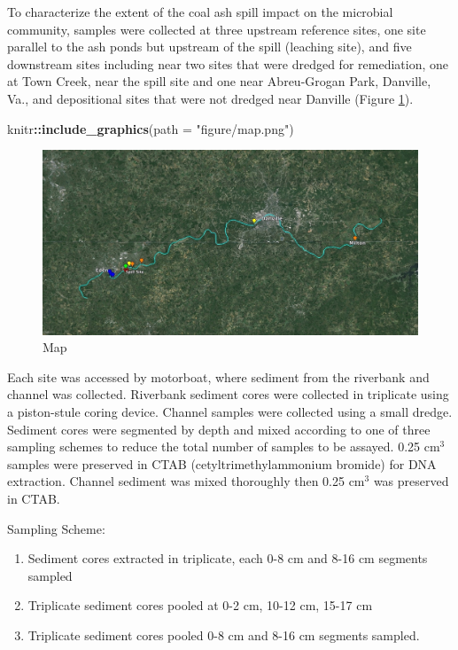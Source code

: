 \documentclass[ms]{uncgdissertationexp}
\newenvironment{Shaded}{\begin{snugshade}}{\end{snugshade}}
\newcommand{\KeywordTok}[1]{\textcolor[rgb]{0.13,0.29,0.53}{\textbf{#1}}}
\newcommand{\DataTypeTok}[1]{\textcolor[rgb]{0.13,0.29,0.53}{#1}}
\newcommand{\StringTok}[1]{\textcolor[rgb]{0.31,0.60,0.02}{#1}}
\newcommand{\OperatorTok}[1]{\textcolor[rgb]{0.81,0.36,0.00}{\textbf{#1}}}
\newcommand{\NormalTok}[1]{#1}
\theoremstyle{plain}
\theoremstyle{definition}
\theoremstyle{remark}
\begin{document}
  To characterize the extent of the coal ash spill impact on the microbial
  community, samples were collected at three upstream reference sites, one
  site parallel to the ash ponds but upstream of the spill (leaching
  site), and five downstream sites including near two sites that were
  dredged for remediation, one at Town Creek, near the spill site and one
  near Abreu-Grogan Park, Danville, Va., and depositional sites that were
  not dredged near Danville (Figure \ref{fig:map}).
  \begin{Shaded}
  \begin{Highlighting}[]
  \NormalTok{knitr}\OperatorTok{::}\KeywordTok{include_graphics}\NormalTok{(}\DataTypeTok{path =} \StringTok{"figure/map.png"}\NormalTok{)}
  \end{Highlighting}
  \end{Shaded}
  \begin{figure}
  \includegraphics[width=24.38in]{figure/map} \caption{Map}\label{fig:map}
  \end{figure}
  Each site was accessed by motorboat, where sediment from the riverbank
  and channel was collected. Riverbank sediment cores were collected in
  triplicate using a piston-stule coring device. Channel samples were
  collected using a small dredge. Sediment cores were segmented by depth
  and mixed according to one of three sampling schemes to reduce the total
  number of samples to be assayed. 0.25 \(\mathrm{cm^3}\) samples were
  preserved in CTAB (cetyltrimethylammonium bromide) for DNA extraction.
  Channel sediment was mixed thoroughly then 0.25 \(\mathrm{cm^3}\) was
  preserved in CTAB.
  
  Sampling Scheme:
  \begin{enumerate}
  \def\labelenumi{\Alph{enumi}.}
  \item
    Sediment cores extracted in triplicate, each 0-8 cm and 8-16 cm
    segments sampled
  \item
    Triplicate sediment cores pooled at 0-2 cm, 10-12 cm, 15-17 cm
  \item
    Triplicate sediment cores pooled 0-8 cm and 8-16 cm segments sampled.
  \end{enumerate}
\end{document}
